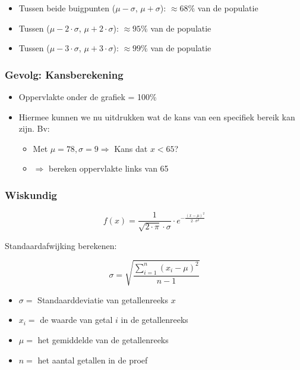 \documentclass{article}
\begin{document}
\begin{itemize}
    \item Tussen beide buigpunten ($\mu - \sigma$, $\mu + \sigma$): $\approx68\%$ van de populatie
    \item Tussen ($\mu - 2\cdot\sigma$, $\mu + 2\cdot\sigma$): $\approx95\%$ van de populatie
    \item Tussen ($\mu - 3\cdot\sigma$, $\mu + 3\cdot\sigma$): $\approx99\%$ van de populatie
\end{itemize}

\subsubsection{Gevolg: Kansberekening}

\begin{itemize}
    \item Oppervlakte onder de grafiek = 100\%
    \item Hiermee kunnen we nu uitdrukken wat de kans van een specifiek bereik kan zijn. Bv:
    \begin{itemize}
        \item Met $\mu = 78, \sigma = 9 \Rightarrow $ Kans dat $x < 65$? 
        \item $\Rightarrow$ bereken oppervlakte links van 65
    \end{itemize}
\end{itemize}

\subsubsection{Wiskundig}

\begin{equation}
f(x) = \frac{1}{\sqrt{2\cdot\pi}\cdot \sigma}\cdot e^{-\frac{(x - \mu)^2}{2\cdot\sigma^2}}
\end{equation}

Standaardafwijking berekenen:

\begin{equation}
    \sigma = \sqrt{\frac{\sum_{i=1}^n (x_i - \mu)^2}{n - 1}}
\end{equation}

\begin{itemize}
    \item $\sigma =$ Standaarddeviatie van getallenreeks $x$
    \item $x_i =$ de waarde van getal $i$ in de getallenreeks
    \item $\mu =$ het gemiddelde van de getallenreeks
    \item $n =$ het aantal getallen in de proef
\end{itemize}
\end{document}
